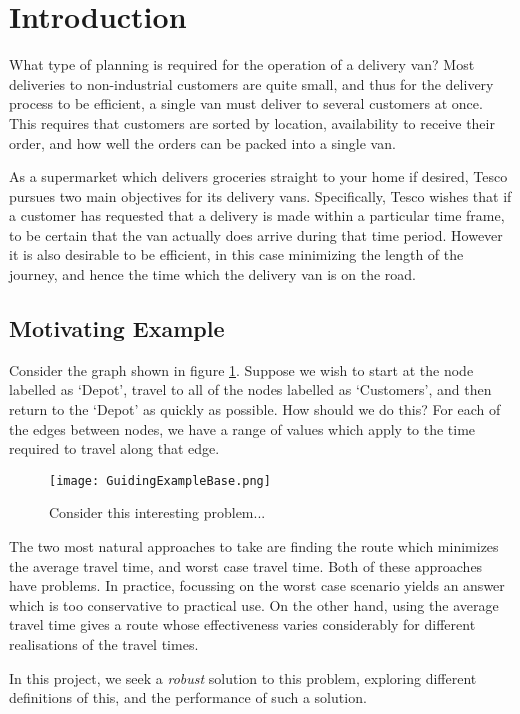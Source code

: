 \section{Introduction}
What type of planning is required for the operation of a delivery van? Most deliveries to non-industrial customers are quite small, and thus for the delivery process to be efficient, a single van must deliver to several customers at once. This requires that customers are sorted by location, availability to receive their order, and how well the orders can be packed into a single van.

As a supermarket which delivers groceries straight to your home if desired, Tesco pursues two main objectives for its delivery vans. Specifically, Tesco wishes that if a customer has requested that a delivery is made within a particular time frame, to be certain that the van actually does arrive during that time period. However it is also desirable to be efficient, in this case minimizing the length of the journey, and hence the time which the delivery van is on the road.


\subsection{Motivating Example}
Consider the graph shown in figure \ref{fig:guiding_example}. Suppose we wish to start at the node labelled as `Depot', travel to all of the nodes labelled as `Customers', and then return to the `Depot' as quickly as possible. How should we do this? For each of the edges between nodes, we have a range of values which apply to the time required to travel along that edge. 

\begin{figure}[h!]
	\centering
	\texttt{[image: GuidingExampleBase.png]}
	\caption{Consider this interesting problem...}
	\label{fig:guiding_example}
\end{figure}

The two most natural approaches to take are finding the route which minimizes the average travel time, and worst case travel time. Both of these approaches have problems. In practice, focussing on the worst case scenario yields an answer which is too conservative to practical use. On the other hand, using the average travel time gives a route whose effectiveness varies considerably for different realisations of the travel times. 

In this project, we seek a \textit{robust} solution to this problem, exploring different definitions of this, and the performance of such a solution.
